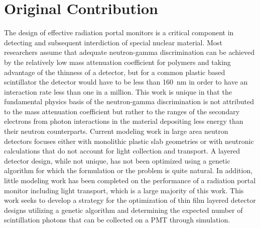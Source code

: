 \section{Original Contribution}
\label{sec:OrginalContribution}
The design of effective radiation portal monitors is a critical component in detecting and subsequent interdiction of special nuclear material.
Most researchers assume that adequate neutron-gamma discrimination can be achieved by the relatively low mass attenuation coefficient for polymers and taking advantage of the thinness of a detector, but for a common plastic based scintillator the detector would have to be less than \SI{160}{\nm} in order to have an interaction rate less than one in a million.
This work is unique in that the fundamental physics basis of the neutron-gamma discrimination is not attributed to the mass attenuation coefficient but rather to the ranges of the secondary electrons from photon interactions in the material depositing less energy than their neutron counterparts.
Current modeling work in large area neutron detectors focuses either with monolithic plastic slab geometries or with neutronic calculations that do not account for light collection and transport.
A layered detector design, while not unique, has not been optimized using a genetic algorithm for which the formulation or the problem is quite natural.
In addition, little modeling work has been completed on the performance of a radiation portal monitor including light transport, which is a large majority of this work.
This work seeks to develop a strategy for the optimization of thin film layered detector designs utilizing a genetic algorithm and determining the expected number of scintillation photons that can be collected on a PMT through simulation.


